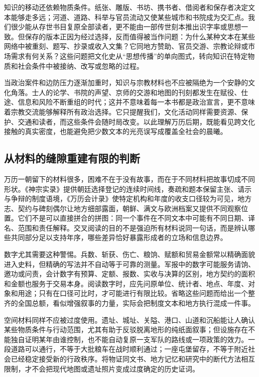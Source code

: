 知识的移动还依赖物质条件。纸张、雕版、书坊、携书者、借阅者和保存者决定文本能够走多远；河道、道路、科举与官员流动又使某些城市和书院成为交汇点。我们很少能从存世书目复原全部读者，更不能由一部传世刻本推出识字率或思想一致。但保存的版本正因为经过选择，反而值得被当作问题：为什么某种文本在某些网络中被重刻、题写、抄录或收入文集？它同地方赞助、官员交游、宗教论辩或市场需求有何关系？这些问题把文化史从“思想传播”的单向图式，转向知识在特定物质和社会条件中被接纳、改写或忽略的过程。

当政治案件和边防压力逐渐加重时，知识与宗教材料也不应被隔绝为一个安静的文化角落。士人的论学、书院的声望、京师的交游和地图的刊刻都发生在赋役、仕途、信息和风险不断重组的时代；这并不意味着每一本书都是政治宣言，更不意味着宗教交流能够解释所有政治选择。它只提醒我们，文化活动同样需要资源、保护、交通和读者，而这些条件会随时局改变。以此理解万历后期，既能看见跨文化接触的真实密度，也能避免把少数文本的光亮误写成覆盖全社会的晨曦。

\subsection{从材料的缝隙重建有限的判断}

万历一朝留下的材料很多，困难不在于没有故事，而在于不同材料把故事切成不同形状。《神宗实录》提供朝廷选择登记的连续时间线，奏疏和题本保留主张、请示与争辩的制度语境，《万历会计录》使特定机构和年度的收支口径较为可见，地方志、契约与碑刻偶尔让地方细部露面，朝鲜、满文与欧洲档案又提供不同观察位置。它们不是可以直接拼合的拼图：同一个事件在不同文本中可能有不同日期、译名、范围和责任解释。交叉阅读的目的不是强迫所有材料说同一句话，而是辨认哪些共同部分足以支持年序，哪些差异恰好暴露形成者的立场和信息边界。

数字尤其需要这种警惕。兵数、斩获、伤亡、粮饷、赋额和贸易金额常以精确面貌进入史料，但精确的写法并不自动等于可靠的测量。军报中的数字可能服务请饷、邀功或问责，会计数字有预算、定额、报数、实收与决算的区别，地方契约的面积和金额也服务于交易本身。阅读数字时，应先问原单位、统计者、地点、年度、对象和用途；只有在口径可比时，才可能进行有限比较。省略这些问题而给出一个整齐的全国总额，看似增强叙事的力量，实际会把制度文本和地方执行混成一件事。

空间材料同样不应被过度使用。遗址、城址、关隘、港口、山道和沉船能让人确认某些物质条件与行动范围，尤其有助于反驳脱离地形的纯纸面叙事；但设施存在不能独自证明某年由谁控制，也不能自动复原一支军队的路线或一项政策的效力。一段道路可以通行，不等于大批粮车在战时顺利通过；一座屯堡留存，不等于附近社会已经稳定接受新的行政秩序。将物证同文书、地方记忆和研究中的断代方法相互限制，才不会把现代地图或遗址照片变成过度确定的历史证词。

